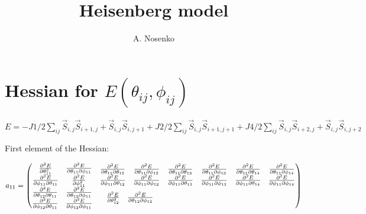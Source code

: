 \documentclass[9pt]{report}
\title{Heisenberg model}
\author{A. Nosenko}
\begin{document}
\maketitle
\tableofcontents


\chapter {Hessian for $E(\theta_{ij},\phi_{ij})$}
$E = -J1/2\sum_{ij}\vec{S}_{i,j}\vec{S}_{i+1,j}+\vec{S}_{i,j}\vec{S}_{i,j+1}+J2/2\sum_{ij}\vec{S}_{i,j}\vec{S}_{i+1,j+1}+J4/2\sum_{ij}\vec{S}_{i,j}\vec{S}_{i+2,j}+\vec{S}_{i,j}\vec{S}_{i,j+2}$
\newline
 
First element of the Hessian:

\begin{equation}\label{eq:1}
	a_{11} = 
	\begin{pmatrix}
		\begin{matrix} 
			\pdv[2]{E}{\theta_{11}} & \pdv{E}{\theta_{11}}{\phi_{11}} \\
			\pdv{E}{\phi_{11}}{\theta_{11}} & \pdv[2]{E}{\phi_{11}}
		\end{matrix}& 	
		\begin{matrix} 
			\pdv{E}{\theta_{11}}{\theta_{12}} & \pdv{E}{\theta_{11}}{\phi_{12}} \\
			\pdv{E}{\phi_{11}}{\theta_{12}} & \pdv{E}{\phi_{11}}{\phi_{12}} 
		\end{matrix}& 
		\begin{matrix} 
			\pdv{E}{\theta_{11}}{\theta_{13}} & \pdv{E}{\theta_{11}}{\phi_{13}} \\
			\pdv{E}{\phi_{11}}{\theta_{13}} & \pdv{E}{\phi_{11}}{\phi_{13}} 
		\end{matrix}&
		\begin{matrix} 
			\pdv{E}{\theta_{11}}{\theta_{14}} & \pdv{E}{\theta_{11}}{\phi_{14}} \\
			\pdv{E}{\phi_{11}}{\theta_{14}} & \pdv{E}{\phi_{11}}{\phi_{14}} 
		\end{matrix}\\
		\begin{matrix} 
			\pdv{E}{\theta_{12}}{\theta_{11}} & \pdv{E}{\theta_{12}}{\phi_{11}} \\
			\pdv{E}{\phi_{12}}{\theta_{11}} & \pdv{E}{\phi_{12}}{\phi_{11}} 
		\end{matrix} & 
		\begin{matrix} 
			\pdv[2]{E}{\theta_{12}} & \pdv{E}{\theta_{12}}{\phi_{12}} \\

\end{matrix}
\end{pmatrix}
\end{equation}
\end{document}
